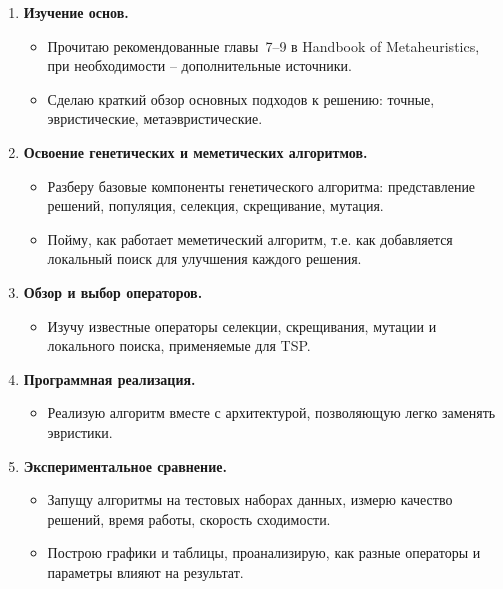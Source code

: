 \documentclass[a4paper,12pt]{article}
\begin{document}
\begin{enumerate}
    \item \textbf{Изучение основ.}
    \begin{itemize}
        \item Прочитаю рекомендованные главы~7--9 в Handbook of Metaheuristics, при необходимости -- дополнительные источники.
        \item Сделаю краткий обзор основных подходов к решению: точные, эвристические, метаэвристические.
    \end{itemize}

    \item \textbf{Освоение генетических и меметических алгоритмов.}
    \begin{itemize}
        \item Разберу базовые компоненты генетического алгоритма: представление решений, популяция, селекция, скрещивание, мутация.
        \item Пойму, как работает меметический алгоритм, т.е. как добавляется локальный поиск для улучшения каждого решения.
    \end{itemize}

    \item \textbf{Обзор и выбор операторов.}
    \begin{itemize}
        \item Изучу известные операторы селекции, скрещивания, мутации и локального поиска, применяемые для TSP.
    \end{itemize}

    \item \textbf{Программная реализация.}
    \begin{itemize}
        \item Реализую алгоритм вместе с архитектурой, позволяющую легко заменять эвристики.
    \end{itemize}

    \item \textbf{Экспериментальное сравнение.}
    \begin{itemize}
        \item Запущу алгоритмы на тестовых наборах данных, измерю качество решений, время работы, скорость сходимости.
        \item Построю графики и таблицы, проанализирую, как разные операторы и параметры влияют на результат.
    \end{itemize}
\end{enumerate}
\end{document}
